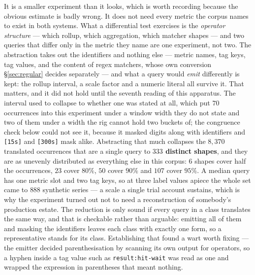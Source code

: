 \begin{remark}\label{rem:shape-reduction}
It is a smaller experiment than it looks, which is worth recording because the obvious
estimate is badly wrong. It does not need every metric the corpus names to exist in both
systems. What a differential test exercises is the \emph{operator structure} --- which
rollup, which aggregation, which matcher shapes --- and two queries that differ only in
the metric they name are one experiment, not two. The abstraction takes out the
identifiers and nothing else --- metric names, tag keys, tag values, and the content of
regex matchers, whose own conversion \S\ref{sec:regular} decides separately --- and what
a query would \emph{emit} differently is kept: the rollup interval, a scale factor and a
numeric literal all survive it. That matters, and it did not hold until the seventh
reading of this apparatus. The interval used to collapse to whether one was stated at
all, which put $70$ occurrences into this experiment under a window width they do not
state and two of them under a width the rig cannot hold two buckets of; the congruence
check below could not see it, because it masked digits along with identifiers and
\texttt{[15s]} and \texttt{[300s]} mask alike. Abstracting that much collapses the
$8{,}370$ translated occurrences that are
a single query to \textbf{$333$ distinct shapes}, and they are as unevenly distributed as
everything else in this corpus: $6$ shapes cover half the occurrences, $23$ cover $80\%$,
$50$ cover $90\%$ and $107$ cover $95\%$. A median query has one metric slot and two tag
keys, so at three label values apiece the whole set came to $888$ synthetic
series --- a scale a single trial account sustains, which is why the experiment turned
out not to need a reconstruction of somebody's production estate. The reduction is only
sound if every query in a class translates the same way, and that is checkable rather
than arguable: emitting all of them and masking the identifiers leaves each class with
exactly one form, so a representative stands for its class. Establishing
that found a wart worth fixing --- the emitter decided parenthesisation by scanning its
own output for operators, so a hyphen inside a tag value such as \texttt{result:hit-wait}
was read as one and wrapped the expression in parentheses that meant nothing.
\end{remark}
